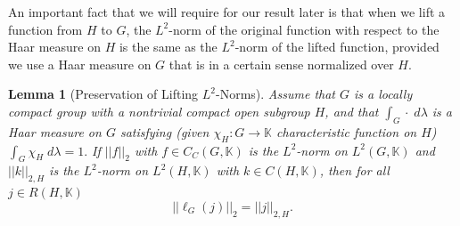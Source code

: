 \documentclass{amsart}
\newtheorem{lemma}[theorem]{Lemma}
\theoremstyle{definition}
\numberwithin{equation}{section}
\newcommand{\lck}{L^2 (G,\mathbb{K})}
\newcommand{\cck}{C_C (G,\mathbb{K})}
\newcommand{\K}{\mathbb{K}}
\begin{document}
An important fact that we will require for our result later is that when we lift a function from $H$ to $G$, the $L^2$-norm of the original function with respect to the Haar measure on $H$ is the same as the $L^2$-norm of the lifted function, provided we use a Haar measure on $G$ that is in a certain sense normalized over $H$.

\begin{lemma}[Preservation of Lifting $L^2$-Norms]\label{liftinglemma} Assume that $G$ is a locally compact group with  a nontrivial  compact open  subgroup $H$, and that $\int_G\cdot \;d\lambda$ is a Haar measure on $G$ satisfying (given $\chi_H:G\rightarrow\K$ characteristic function on $H$) $\int_G \chi_H  \; d\lambda=1.$ 
If  $||f||_2$ with $f\in\cck$ is the $L^2$-norm on $\lck$ and  $||k||_{2,H}$ is the $L^2$-norm on $L^2(H,\K)$ with $k\in C(H,\K)$, then  for all $j\in R(H,\K)$ 
 \[
 ||\ell_G(j)||_2=||j||_{2,H}.
 \]
\end{lemma}
\end{document}

